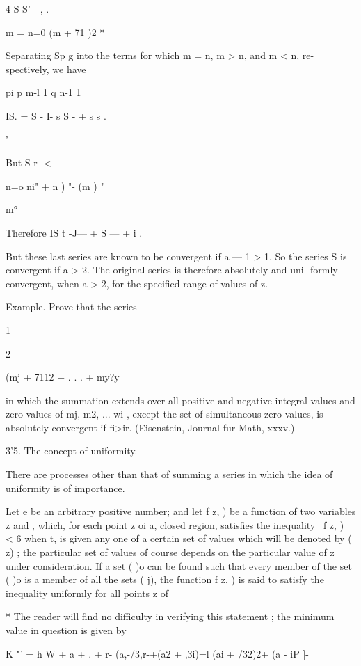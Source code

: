  4 S S' - , .

m = n=0 (m + 71 )2 *

Separating Sp g into the terms for which m = n, m > n, and m < n, re-
spectively, we have

pi p m-l 1 q n-1 1

IS. = S - I- s S - + s s .

'%

But S r- <



n=o ni" + n ) "- (m ) "



m°



Therefore IS t -J— + S — + i .

But these last series are known to be convergent if a — 1 > 1. So the
series S is convergent if a > 2. The original series is therefore
absolutely and uni- formly convergent, when a > 2, for the specified
range of values of z.

Example. Prove that the series

1

2



(mj + 7112 + . . . + my?y

in which the summation extends over all positive and negative integral
values and zero values of mj, m2, ... wi , except the set of
simultaneous zero values, is absolutely convergent if fi>ir.
(Eisenstein, Journal fur Math, xxxv.)

3'5. The concept of uniformity.

There are processes other than that of summing a series in which the
idea of uniformity is of importance.

Let e be an arbitrary positive number; and let f z, ) be a function of
two variables z and , which, for each point z oi a, closed region,
satisfies the inequality \ f z, ) | < 6 when t, is given any one of a
certain set of values which will be denoted by ( z) ; the particular
set of values of course depends on the particular value of z under
consideration. If a set ( )o can be found such that every member of
the set ( )o is a member of all the sets ( j), the function f z, ) is
said to satisfy the inequality uniformly for all points z of

* The reader will find no difficulty in verifying this statement ; the
minimum value in question is given by

K "' = h W + a + . + r- (a,-/3,r-+(a2 + ,3i)=l (ai + /32)2+ (a - iP ]-



